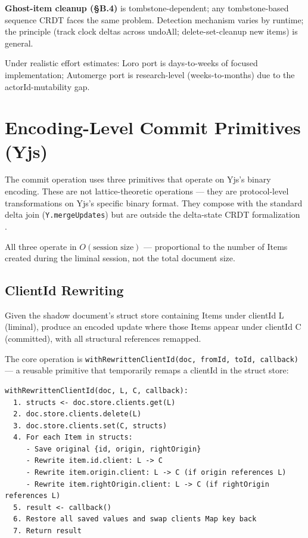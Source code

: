 \textbf{Ghost-item cleanup (\S B.4)} is tombstone-dependent; any tombstone-based sequence CRDT faces the same problem. Detection mechanism varies by runtime; the principle (track clock deltas across undoAll; delete-set-cleanup new items) is general.

Under realistic effort estimates: Loro port is days-to-weeks of focused implementation; Automerge port is research-level (weeks-to-months) due to the actorId-mutability gap.

\section{Encoding-Level Commit Primitives (Yjs)}

The commit operation uses three primitives that operate on Yjs's binary encoding. These are not lattice-theoretic operations --- they are protocol-level transformations on Yjs's specific binary format. They compose with the standard delta join (\texttt{Y.mergeUpdates}) but are outside the delta-state CRDT formalization \cite{almeida2018delta}.

All three operate in $O(\text{session size})$ --- proportional to the number of Items created during the liminal session, not the total document size.

\subsection{ClientId Rewriting}

Given the shadow document's struct store containing Items under clientId L (liminal), produce an encoded update where those Items appear under clientId C (committed), with all structural references remapped.

The core operation is \texttt{withRewrittenClientId(doc, fromId, toId, callback)} --- a reusable primitive that temporarily remaps a clientId in the struct store:

\begin{lstlisting}
withRewrittenClientId(doc, L, C, callback):
  1. structs <- doc.store.clients.get(L)
  2. doc.store.clients.delete(L)
  3. doc.store.clients.set(C, structs)
  4. For each Item in structs:
     - Save original {id, origin, rightOrigin}
     - Rewrite item.id.client: L -> C
     - Rewrite item.origin.client: L -> C (if origin references L)
     - Rewrite item.rightOrigin.client: L -> C (if rightOrigin references L)
  5. result <- callback()
  6. Restore all saved values and swap clients Map key back
  7. Return result
\end{lstlisting}

